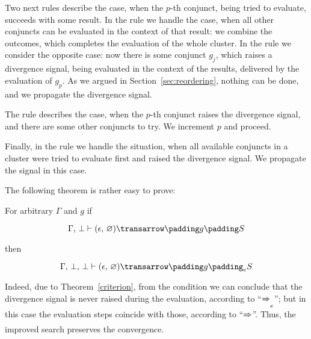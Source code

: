 Two next rules describe the case, when the $p$-th conjunct, being tried to evaluate, succeeds with some result. In the rule
 we handle the case, when all other conjuncts can be evaluated in the context of that result: we
combine the outcomes, which completes the evaluation of the whole cluster. In the rule  we consider
the opposite case: now there is some conjunct $g_j$, which raises a divergence signal, being evaluated in the context of
the results, delivered by the evaluation of $g_p$. As we argued in Section~\ref{sec:reordering}, nothing can be done, and we
propagate the divergence signal.

The rule  describes the case, when the $p$-th conjunct raises the divergence signal, and there are
some other conjuncts to try. We increment $p$ and proceed.

Finally, in the rule  we handle the situation, when all available conjuncts in a cluster were tried to
evaluate first and raised the divergence signal. We propagate the signal in this case.

The following theorem is rather easy to prove:

\begin{theorem} For arbitrary $\Gamma$ and $g$ if

  \[{\setsubarrow{}\otrans{\Gamma,\,\bot}{(\epsilon,\,\emptyset)}{g}{S}}\]

  then
  
  \[{\setsubarrow{_e}\otrans{\Gamma,\,\bot,\,\bot}{(\epsilon,\,\emptyset)}{g}{S}}\]

\end{theorem}

Indeed, due to Theorem~\ref{criterion}, from the condition we can conclude that the divergence signal is
never raised during the evaluation, according to ``$\xRightarrow{}_e$''; but in this case the evaluation
steps coincide with those, according to ``$\xRightarrow{}$''. Thus, the improved search preserves the convergence.
